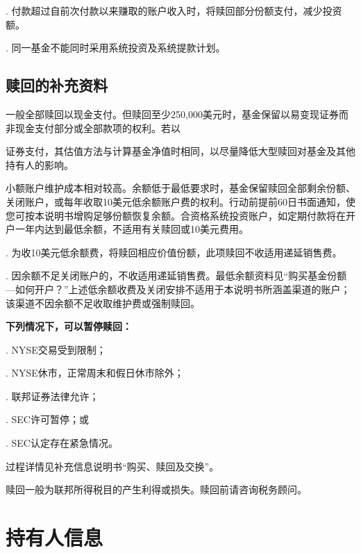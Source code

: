 \documentclass[UTF8,fontset=none,11pt,a4paper]{ctexart}
\begin{document}
. 付款超过自前次付款以来赚取的账户收入时，将赎回部分份额支付，减\allowbreak\mbox{少投资额。}


. 同一基金不能同时采用系统投资及系统\allowbreak\mbox{提款计划。}


\subsection*{赎回的补充资料}
一般全部赎回以现金支付。但赎回至少250,000美元时，基金保留以易变现证券而非现金支付部分或全部款项的权利。若以


\par{}\label{originalpage20}

证券支付，其估值方法与计算基金净值时相同，以尽量降低大型赎回对基金及其他持有\allowbreak\mbox{人的影响。}

小额账户维护成本相对较高。余额低于最低要求时，基金保留赎回全部剩余份额、关闭账户，或每年收取10美元低余额账户费的权利。行动前提前60日书面通知，使您可按本说明书增购足够份额恢复余额。合资格系统投资账户，如定期付款将在开户一年内达到最低余额，不适用有关赎回或10\allowbreak\mbox{美元费用。}

. 为收10美元低余额费，将赎回相应价值份额，此项赎回不收适用递\allowbreak\mbox{延销售费。}


. 因余额不足关闭账户的，不收适用递延销售费。最低余额资料见“购买基金份额—如何开户？”上述低余额收费及关闭安排不适用于本说明书所涵盖渠道的账户；该渠道不因余额不足收取维护费或\allowbreak\mbox{强制赎回。}


\textbf{下列情况下，可以暂停赎回：}

. NYSE交易\allowbreak\mbox{受到限制；}


. NYSE休市，正常周末和假日\allowbreak\mbox{休市除外；}


. 联邦证券\allowbreak\mbox{法律允许；}


. SEC许可暂停；或


. SEC认定存在\allowbreak\mbox{紧急情况。}


过程详情见补充信息说明书“购买、赎\allowbreak\mbox{回及交换”。}

赎回一般为联邦所得税目的产生利得或损失。赎回前请咨询\allowbreak\mbox{税务顾问。}


\par{}\label{originalpage21}
\section*{持有人信息}\label{unitU790}
\end{document}
